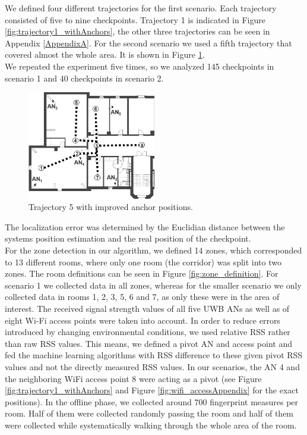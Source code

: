 \noindent\hspace*{5mm}%
We defined four different trajectories for the first scenario. Each trajectory consisted of five to nine checkpoints. Trajectory 1 is indicated in Figure \ref{fig:trajectory1_withAnchors}, the other three trajectories can be seen in Appendix \ref{AppendixA}.
For the second scenario we used a fifth trajectory that covered almost the whole area. It is shown in Figure \ref{fig:trajectory5_withAnchors}.\\
\noindent\hspace*{5mm}%
We repeated the experiment five times, so we analyzed 145 checkpoints in scenario 1 and 40 checkpoints in scenario 2.\begin{figure}[th]
\centering
\includegraphics[width=0.5\textwidth]{Figures/trajectory5_withAnchors}
\decoRule
\caption[Trajectory 5]{Trajectory 5 with improved anchor positions.}
\label{fig:trajectory5_withAnchors}
\end{figure}
The localization error was determined by the Euclidian distance between the systems position estimation and the real position of the checkpoint.\\
\noindent\hspace*{5mm}%
For the zone detection in our algorithm, we defined 14 zones, which corresponded to 13 different rooms, where only one room (the corridor) was split into two zones. The room definitions can be seen in Figure \ref{fig:zone_definition}. For scenario 1 we collected data in all zones, whereas for the smaller scenario we only collected data in rooms 1, 2, 3, 5, 6 and 7, as only these were in the area of interest. The received signal strength values of all five UWB ANs as well as of eight Wi-Fi access points were taken into account. In order to reduce errors introduced by changing environmental conditions, we used relative RSS rather than raw RSS values. This means, we defined a pivot AN and access point and fed the machine learning algorithms with RSS difference to these given pivot RSS values and not the directly measured RSS values. In our scenarios, the AN 4 and the neighboring WiFi access point 8 were acting as a pivot (see Figure \ref{fig:trajectory1_withAnchors} and Figure \ref{fig:wifi_accessAppendix} for the exact positions). In the offline phase, we collected around 700 fingerprint measures per room. Half of them were collected randomly passing the room and half of them were collected while systematically walking through the whole area of the room.
